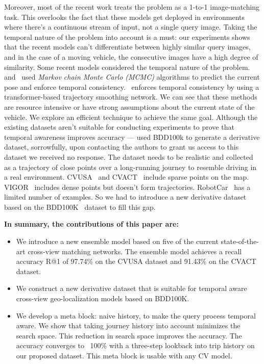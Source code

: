 \documentclass[10pt,letterpaper]{article}
\newif\ifhighlight
\newcommand{\hlb}[1]{\ifhighlight{\hl{#1}}\else{#1}\fi}
\begin{document}
Moreover, most of the recent work treats the problem as a 1-to-1 image-matching task. This overlooks the fact that these models get deployed in environments where there's a continuous stream of input, not a single query image. Taking the temporal nature of the problem into account is a must:  our experiments shows that the recent models can't differentiate between highly similar query images, and in the case of a moving vehicle, the consecutive images have a high degree of similarity. Some recent models considered the temporal nature of the problem.~\cite{bib7}  and~\cite{bib20,bib21,bib22} used \emph{Markov chain Monte Carlo (MCMC)} algorithms to predict the current pose and enforce temporal consistency.~\cite{bib24} enforces temporal consistency by using a transformer-based trajectory smoothing network. We can see that these methods are resource intensive or have strong assumptions about the current state of the vehicle. We explore an efficient technique to achieve the same goal.
Although the existing datasets aren't suitable for conducting experiments to prove that temporal awareness improves accuracy  — \cite{bib24} used BDD100k to generate a derivative dataset, sorrowfully, upon contacting the authors to grant us access to this dataset we received no response. The dataset needs to be realistic and collected as a trajectory of close points over a long-running journey to resemble driving in a real environment.  CVUSA~\cite{bib55} and CVACT~\cite{bib4} include sparse points on the map. VIGOR~\cite{bib5} includes dense points but doesn't form trajectories. RobotCar~\cite{bib6} has a limited number of examples. So we had to introduce a new derivative dataset based on the BDD100K~\cite{bib12} dataset to fill this gap.

\hlb{\bf In summary, the contributions of this paper are:}
\begin{itemize}
    \item We introduce a new ensemble model based on five of the current state-of-the-art  cross-view matching networks. The ensemble model achieves a recall accuracy R@1 of 97.74\% on the CVUSA dataset and 91.43\% on the CVACT dataset.
    \item We construct a new derivative dataset that is suitable for temporal aware cross-view geo-localization models based on BDD100K.
    \item We develop a meta block: naive history, to make the query process temporal aware. We show that taking journey history into account minimizes the search space. This reduction in search space improves the accuracy.  The accuracy converges to ~100\% with a three-step lookback into trip history on our proposed dataset. This meta block is usable with any CV model.
\end{itemize}
\end{document}
